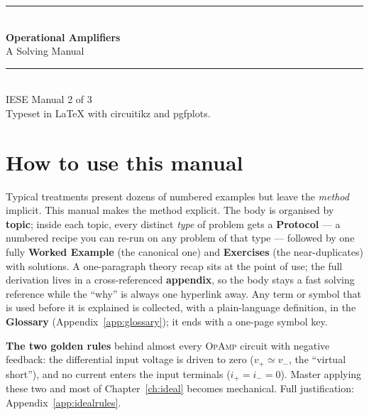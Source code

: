 \documentclass[11pt,a4paper,oneside]{book}
\newcommand{\op}{\textsc{OpAmp}}
\begin{document}
\frontmatter

\begingroup
\thispagestyle{empty}\centering
\vspace*{2.2cm}
{\color{accent}\rule{\linewidth}{1.4pt}}\\[0.5cm]
{\Huge\bfseries\color{accent} Operational Amplifiers}\\[0.35cm]
{\LARGE A Solving Manual}\\[0.4cm]
{\color{accent}\rule{\linewidth}{1.4pt}}\\[1.2cm]
{\large IESE Manual 2 of 3}\\[1.6cm]      
{\footnotesize Typeset in \LaTeX{} with circuitikz and pgfplots.}
\par\vspace*{\fill}
\endgroup
\clearpage

\chapter*{How to use this manual}

Typical treatments present dozens of numbered examples but leave the
\emph{method} implicit. This manual makes the method explicit. The body is
organised by \textbf{topic}; inside each topic, every distinct \emph{type} of
problem gets a \textbf{Protocol} --- a numbered recipe you can re-run on any
problem of that type --- followed by one fully \textbf{Worked Example} (the
canonical one) and \textbf{Exercises} (the near-duplicates) with
solutions. A one-paragraph theory recap sits at the point of use; the full
derivation lives in a cross-referenced \textbf{appendix}, so the body stays a
fast solving reference while the ``why'' is always one hyperlink away. Any term
or symbol that is used before it is explained is collected, with a plain-language
definition, in the \textbf{Glossary} (Appendix~\ref{app:glossary}); it ends with a
one-page symbol key.

\begin{keyidea}
\textbf{The two golden rules} behind almost every \op{} circuit with negative
feedback: the differential input voltage is driven to zero ($v_+\simeq v_-$,
the ``virtual short''), and no current enters the input terminals
($i_+=i_-=0$). Master applying these two and most of Chapter~\ref{ch:ideal}
becomes mechanical. Full justification: Appendix~\ref{app:idealrules}.
\end{keyidea}
\end{document}
